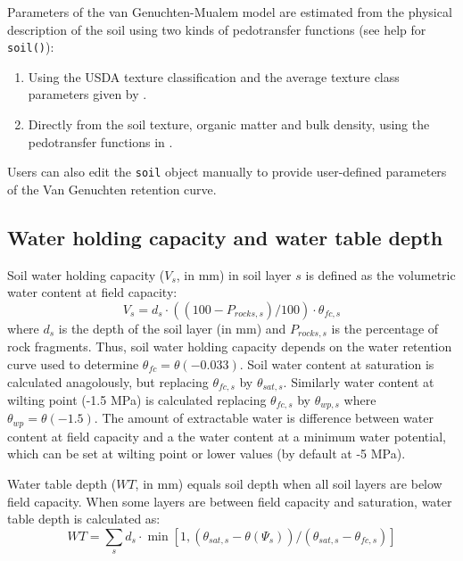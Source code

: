 \documentclass[]{book}
\providecommand{\tightlist}{%
  \setlength{\itemsep}{0pt}\setlength{\parskip}{0pt}}
\begin{document}
Parameters of the van Genuchten-Mualem model are estimated from the physical description of the soil using two kinds of pedotransfer functions (see help for \texttt{soil()}):

\begin{enumerate}
\def\labelenumi{\arabic{enumi}.}
\tightlist
\item
  Using the USDA texture classification and the average texture class parameters given by \citet{Carsel1988}.
\item
  Directly from the soil texture, organic matter and bulk density, using the pedotransfer functions in \citet{Toth2015}.
\end{enumerate}

Users can also edit the \texttt{soil} object manually to provide user-defined parameters of the Van Genuchten retention curve.

\hypertarget{water-holding-capacity-and-water-table-depth}{%
\subsection{Water holding capacity and water table depth}\label{water-holding-capacity-and-water-table-depth}}

Soil water holding capacity (\(V_s\), in mm) in soil layer \(s\) is defined as the volumetric water content at field capacity:
\begin{equation}
V_s = d_s\cdot ((100-P_{rocks,s})/100)\cdot\theta_{fc,s}
\end{equation}
where \(d_s\) is the depth of the soil layer (in mm) and \(P_{rocks,s}\) is the percentage of rock fragments. Thus, soil water holding capacity depends on the water retention curve used to determine \(\theta_{fc} = \theta(-0.033)\). Soil water content at saturation is calculated anagolously, but replacing \(\theta_{fc,s}\) by \(\theta_{sat,s}\). Similarly water content at wilting point (-1.5 MPa) is calculated replacing \(\theta_{fc,s}\) by \(\theta_{wp,s}\) where \(\theta_{wp} = \theta(-1.5)\). The amount of extractable water is difference between water content at field capacity and a the water content at a minimum water potential, which can be set at wilting point or lower values (by default at -5 MPa).

Water table depth (\(WT\), in mm) equals soil depth when all soil layers are below field capacity. When some layers are between field capacity and saturation, water table depth is calculated as:
\begin{equation}
WT = \sum_{s}{d_s \cdot \min\left[1,(\theta_{sat,s} - \theta(\Psi_s))/(\theta_{sat,s}-\theta_{fc,s})\right]}
\end{equation}
\end{document}
